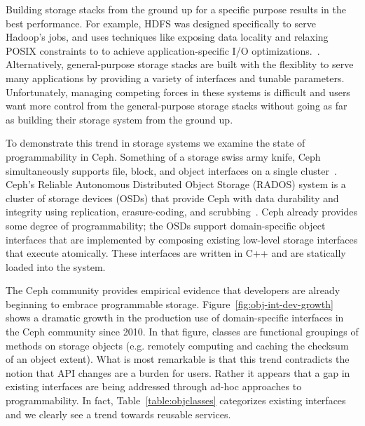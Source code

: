 \documentclass[preprint]{sigplanconf-eurosys}
\begin{document}
Building storage stacks from the ground up for a specific purpose results in
the best performance. For example, HDFS was designed specifically to serve
Hadoop's jobs, and uses techniques like exposing data locality and relaxing
POSIX constraints to to achieve application-specific I/O
optimizations.~\cite{CITEME}. Alternatively, general-purpose storage stacks are
built with the flexiblity to serve many applications by providing a variety of
interfaces and tunable parameters. Unfortunately, managing competing forces in
these systems is difficult and users want more control from the general-purpose
storage stacks without going as far as building their storage system from the
ground up.

To demonstrate this trend in storage systems we examine the state of
programmability in Ceph. Something of a storage swiss army knife, Ceph
simultaneously supports file, block, and object interfaces on a single
cluster~\cite{ceph_contributors_ceph_2010}. Ceph's Reliable Autonomous
Distributed Object Storage (RADOS) system is a cluster of storage devices
(OSDs) that provide Ceph with data durability and integrity using replication,
erasure-coding, and scrubbing~\cite{weil_rados_2007}. Ceph already provides
some degree of programmability; the OSDs support domain-specific object
interfaces that are implemented by composing existing low-level storage
interfaces that execute atomically. These interfaces are written in C++ and are
statically loaded into the system.

The Ceph community provides empirical evidence that developers are already
beginning to embrace programmable storage. Figure~\ref{fig:obj-int-dev-growth}
shows a dramatic growth in the production use of domain-specific interfaces in
the Ceph community since 2010. In that figure, classes are functional groupings
of methods on storage objects (e.g. remotely computing and caching the checksum
of an object extent).  What is most remarkable is that this trend contradicts
the notion that API changes are a burden for users.  Rather it appears that a
gap in existing interfaces are being addressed through ad-hoc approaches to
programmability. In fact, Table~\ref{table:objclasses} categorizes existing
interfaces and we clearly see a trend towards reusable services.
\end{document}
